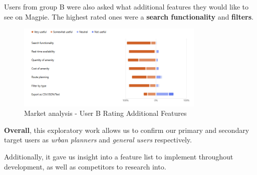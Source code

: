 Users from group B were also asked what additional features they would like to see on Magpie. The highest rated ones were a \textbf{search functionality} and \textbf{filters}.
\begin{figure}[h!]
    \centering
    \includegraphics[width=0.8\textwidth]{images/mr-extra-features.png}
    \caption{Market analysis - User B Rating Additional Features}
\end{figure}

\textbf{Overall}, this exploratory work allows us to confirm our primary and secondary target users as \emph{urban planners} and \emph{general users} respectively.

Additionally, it gave us insight into a feature list to implement throughout development, as well as competitors to research into.

\newpage{}